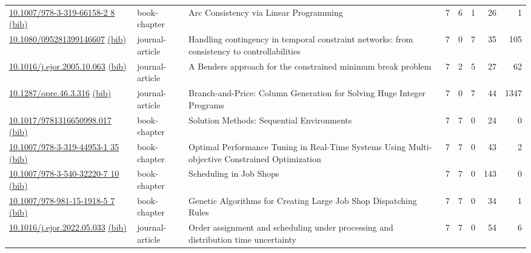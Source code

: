 {\begin{longtable}{p{5cm}lp{11cm}rrrrr}
\href{http://dx.doi.org/10.1007/978-3-319-66158-2_8}{10.1007/978-3-319-66158-2 8} \href{https://www.doi2bib.org/bib/10.1007/978-3-319-66158-2_8}{(bib)} & book-chapter & Arc Consistency via Linear Programming & 7 & 6 & 1 & 26 & 1 \\
\href{http://dx.doi.org/10.1080/095281399146607}{10.1080/095281399146607} \href{https://www.doi2bib.org/bib/10.1080/095281399146607}{(bib)} & journal-article & Handling contingency in temporal constraint networks: from consistency to controllabilities & 7 & 0 & 7 & 35 & 105 \\
\href{http://dx.doi.org/10.1016/j.ejor.2005.10.063}{10.1016/j.ejor.2005.10.063} \href{https://www.doi2bib.org/bib/10.1016/j.ejor.2005.10.063}{(bib)} & journal-article & A Benders approach for the constrained minimum break problem & 7 & 2 & 5 & 27 & 62 \\
\href{http://dx.doi.org/10.1287/opre.46.3.316}{10.1287/opre.46.3.316} \href{https://www.doi2bib.org/bib/10.1287/opre.46.3.316}{(bib)} & journal-article & Branch-and-Price: Column Generation for Solving Huge Integer Programs & 7 & 0 & 7 & 44 & 1347 \\
\href{http://dx.doi.org/10.1017/9781316650998.017}{10.1017/9781316650998.017} \href{https://www.doi2bib.org/bib/10.1017/9781316650998.017}{(bib)} & book-chapter & Solution Methods: Sequential Environments & 7 & 7 & 0 & 24 & 0 \\
\href{http://dx.doi.org/10.1007/978-3-319-44953-1_35}{10.1007/978-3-319-44953-1 35} \href{https://www.doi2bib.org/bib/10.1007/978-3-319-44953-1_35}{(bib)} & book-chapter & Optimal Performance Tuning in Real-Time Systems Using Multi-objective Constrained Optimization & 7 & 7 & 0 & 43 & 2 \\
\href{http://dx.doi.org/10.1007/978-3-540-32220-7_10}{10.1007/978-3-540-32220-7 10} \href{https://www.doi2bib.org/bib/10.1007/978-3-540-32220-7_10}{(bib)} & book-chapter & Scheduling in Job Shops & 7 & 7 & 0 & 143 & 0 \\
\href{http://dx.doi.org/10.1007/978-981-15-1918-5_7}{10.1007/978-981-15-1918-5 7} \href{https://www.doi2bib.org/bib/10.1007/978-981-15-1918-5_7}{(bib)} & book-chapter & Genetic Algorithms for Creating Large Job Shop Dispatching Rules & 7 & 7 & 0 & 34 & 1 \\
\href{http://dx.doi.org/10.1016/j.ejor.2022.05.033}{10.1016/j.ejor.2022.05.033} \href{https://www.doi2bib.org/bib/10.1016/j.ejor.2022.05.033}{(bib)} & journal-article & Order assignment and scheduling under processing and distribution time uncertainty & 7 & 7 & 0 & 54 & 6 \\

\end{longtable}}
